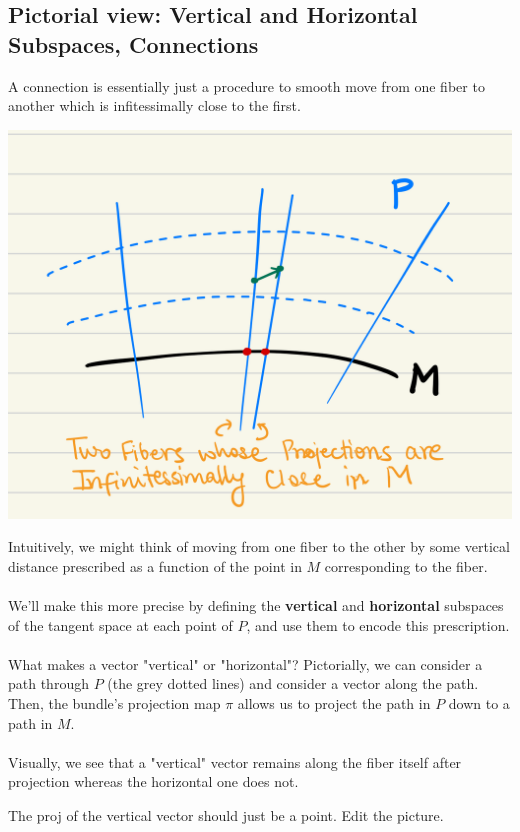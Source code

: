 \documentclass[11pt]{article}
\begin{document}
\subsection{Pictorial view: Vertical and Horizontal Subspaces, Connections}
A connection is essentially just a procedure to smooth move from one fiber to another which is infitessimally close to the first.
\begin{center}
    \includegraphics*[scale=0.15]{pictures/Infinitessimally_close_fibers.png}
\end{center}
Intuitively, we might think of moving from one fiber to the other by some vertical distance prescribed as a function of the point in $M$ corresponding to the fiber.
\\
\\ 
We'll make this more precise by defining the \textbf{vertical} and \textbf{horizontal} subspaces of the tangent space at each point of $P$, and use them to encode this prescription.
\\
\\
What makes a vector "vertical" or "horizontal"? Pictorially, we can consider a path through $P$ (the grey dotted lines) and consider a vector along the path. Then, the bundle's projection map $\pi$ allows us to project the path in $P$ down to a path in $M$. 
\\
\\
Visually, we see that a "vertical" vector remains along the fiber itself after projection whereas the horizontal one does not. 
\begin{note}
    {The proj of the vertical vector should just be a point. Edit the picture.}
\end{note} 
\end{document}
